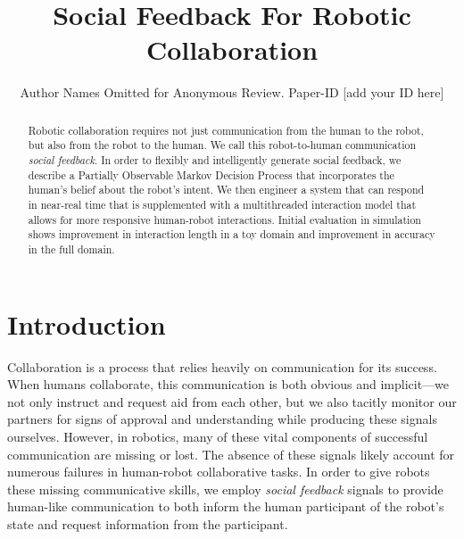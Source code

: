 \documentclass[conference]{IEEEtran}
\begin{document}
\title{Social Feedback For Robotic Collaboration}
\author{Author Names Omitted for Anonymous Review. Paper-ID [add your ID here]}

\maketitle





\begin{abstract}
Robotic collaboration requires not just communication from the human to the robot, but also from the robot to the human. We call this robot-to-human communication \emph{social feedback}. In order to flexibly and intelligently generate social feedback, we describe a Partially Observable Markov Decision Process that incorporates the human's belief about the robot's intent. We then engineer a system that can respond in near-real time that is supplemented with a multithreaded interaction model that allows for more responsive human-robot interactions. Initial evaluation in simulation shows improvement in interaction length in a toy domain and improvement in accuracy in the full domain.
\end{abstract}

	
\section{Introduction}

Collaboration is a process that relies heavily on communication for its success. When humans collaborate, this communication is both obvious and implicit---we not only instruct and request aid from each other, but we also tacitly monitor our partners for signs of approval and understanding while producing these signals ourselves. However, in robotics, many of these vital components of successful communication are missing or lost. The absence of these signals likely account for numerous failures in human-robot collaborative tasks. In order to give robots these missing communicative skills, we employ \emph{social feedback} signals to provide human-like communication to both inform the human participant of the robot's state and request information from the participant. 
\end{document}
